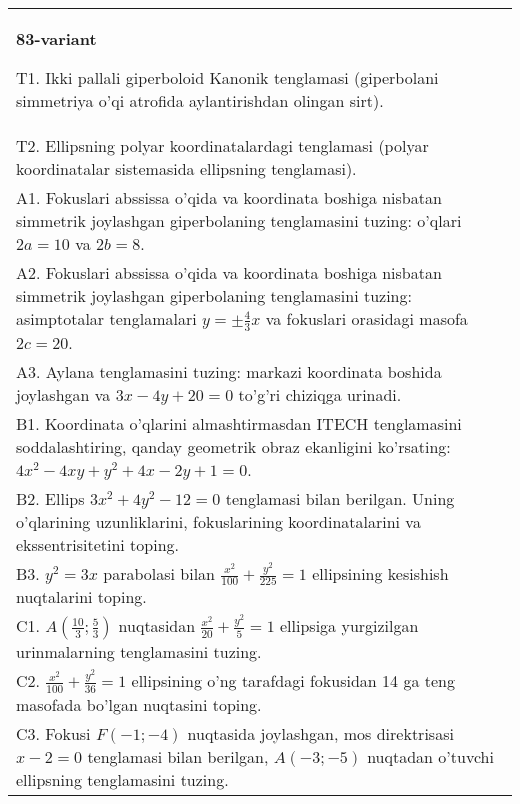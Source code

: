 \documentclass{article}
\begin{document}
\begin{tabular}{m{17cm}}
\textbf{83-variant}
\newline

T1. Ikki pallali giperboloid Kanonik tenglamasi (giperbolani simmetriya o'qi atrofida aylantirishdan olingan sirt).\\

T2. Ellipsning polyar koordinatalardagi tenglamasi (polyar koordinatalar sistemasida ellipsning tenglamasi).\\

A1. Fokuslari abssissa o'qida va koordinata boshiga nisbatan simmetrik joylashgan giperbolaning tenglamasini tuzing: o'qlari $2a=10$ va $2b=8$.\\

A2. Fokuslari abssissa o'qida va koordinata boshiga nisbatan simmetrik joylashgan giperbolaning tenglamasini tuzing: asimptotalar tenglamalari $y=\pm \frac{4}{3}x$ va fokuslari orasidagi masofa $2c=20$.\\

A3. Aylana tenglamasini tuzing: markazi koordinata boshida joylashgan va $3x-4y+20=0$ to'g'ri chiziqga urinadi.\\

B1. Koordinata o'qlarini almashtirmasdan ITECH tenglamasini soddalashtiring, qanday geometrik obraz ekanligini ko'rsating: $4x^{2} - 4xy + y^{2} + 4x - 2y + 1 = 0$.  \\

B2. Ellips $3x^{2} + 4y^{2} - 12 = 0$ tenglamasi bilan berilgan. Uning o'qlarining uzunliklarini, fokuslarining koordinatalarini va ekssentrisitetini toping.  \\

B3. $y^{2} = 3x$ parabolasi bilan $\frac{x^{2}}{100} + \frac{y^{2}}{225} = 1$ ellipsining kesishish nuqtalarini toping.  \\

C1. $A(\frac{10}{3};\frac{5}{3})$ nuqtasidan $\frac{x^{2}}{20} + \frac{y^{2}}{5} = 1$ ellipsiga yurgizilgan urinmalarning tenglamasini tuzing.  \\

C2. $\frac{x^{2}}{100} + \frac{y^{2}}{36} = 1$ ellipsining o'ng tarafdagi fokusidan 14 ga teng masofada bo'lgan nuqtasini toping.  \\

C3. Fokusi $F( - 1; - 4)$ nuqtasida joylashgan, mos direktrisasi $x - 2 = 0$ tenglamasi bilan berilgan, $A( - 3; - 5)$ nuqtadan o'tuvchi ellipsning tenglamasini tuzing.  \\

\end{tabular}
\vspace{1cm}
\end{document}
